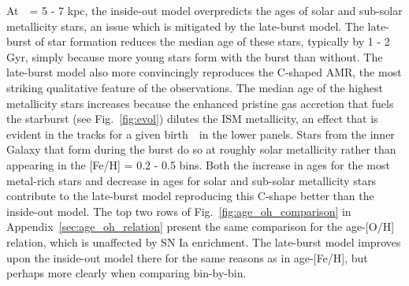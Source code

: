 \documentclass[draft2.tex]{subfiles}
\begin{document}
At~\rgal~= 5 - 7 kpc, the inside-out model overpredicts the ages of solar and 
sub-solar metallicity stars, an issue which is mitigated by the late-burst 
model. 
The late-burst of star formation reduces the median age of these stars, 
typically by 1 - 2 Gyr, simply because more young stars form with the burst 
than without. 
The late-burst model also more convincingly reproduces the C-shaped AMR, the 
most striking qualitative feature of the observations. 
The median age of the highest metallicity stars increases because the enhanced 
pristine gas accretion that fuels the starburst (see Fig.~\ref{fig:evol}) 
dilutes the ISM metallicity, an effect that is evident in the tracks for a 
given birth~\rgal~in the lower panels. 
Stars from the inner Galaxy that form during the burst do so at roughly solar 
metallicity rather than appearing in the [Fe/H] = 0.2 - 0.5 bins. 
Both the increase in ages for the most metal-rich stars and decrease in ages 
for solar and sub-solar metallicity stars contribute to the late-burst model 
reproducing this C-shape better than the inside-out model. 
The top two rows of Fig.~\ref{fig:age_oh_comparison} in 
Appendix~\ref{sec:age_oh_relation} present the same comparison for the 
age-[O/H] relation, which is unaffected by SN Ia enrichment. 
The late-burst model improves upon the inside-out model there for the same 
reasons as in age-[Fe/H], but perhaps more clearly when comparing bin-by-bin. 
\par 
\end{document}
